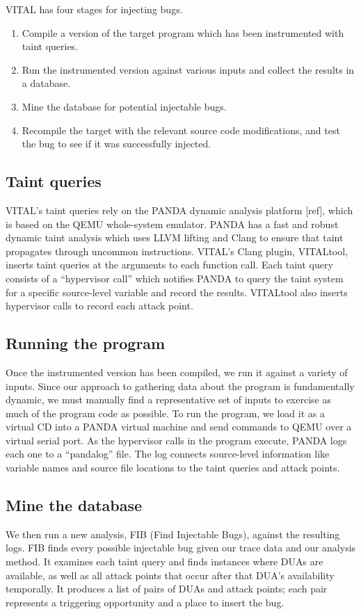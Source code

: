 VITAL has four stages for injecting bugs.
\begin{enumerate}
\item Compile a version of the target program which has been instrumented with taint queries.
\item Run the instrumented version against various inputs and collect the results in a database.
\item Mine the database for potential injectable bugs.
\item Recompile the target with the relevant source code modifications, and test the bug to see if it was successfully injected.
\end{enumerate}

\subsection{Taint queries}
VITAL's taint queries rely on the PANDA dynamic analysis platform [ref], which is based on the QEMU whole-system emulator.
PANDA has a fast and robust dynamic taint analysis which uses LLVM lifting and Clang to ensure that taint propagates through uncommon instructions.
VITAL's Clang plugin, VITALtool, inserts taint queries at the arguments to each function call.
Each taint query consists of a ``hypervisor call'' which notifies PANDA to query the taint system for a specific source-level variable and record the results.
VITALtool also inserts hypervisor calls to record each attack point.

\subsection{Running the program}
Once the instrumented version has been compiled, we run it against a variety of inputs.
Since our approach to gathering data about the program is fundamentally dynamic, we must manually find a representative set of inputs to exercise as much of the program code as possible.
To run the program, we load it as a virtual CD into a PANDA virtual machine and send commands to QEMU over a virtual serial port.
As the hypervisor calls in the program execute, PANDA logs each one to a ``pandalog'' file.
The log connects source-level information like variable names and source file locations to the taint queries and attack points.

\subsection{Mine the database}
We then run a new analysis, FIB (Find Injectable Bugs), against the resulting logs.
FIB finds every possible injectable bug given our trace data and our analysis method.
It examines each taint query and finds instances where DUAs are available, as well as all attack points that occur after that DUA's availability temporally.
It produces a list of pairs of DUAs and attack points; each pair represents a triggering opportunity and a place to insert the bug.


